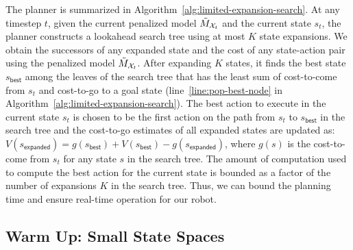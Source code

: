 The planner is summarized in Algorithm~\ref{alg:limited-expansion-search}. At any
timestep $t$, given the
current penalized model $\tilde{M}_{\mathcal{X}_t}$ and the current
state $s_t$, the planner constructs a lookahead
search tree using at most $K$ state expansions. We obtain the successors of any
expanded state and the cost of any state-action pair using the
penalized model $\tilde{M}_{\mathcal{X}_t}$.
After expanding $K$
states, it finds the best state $s_{\mathsf{best}}$ among the leaves of the search tree
that has the least sum of cost-to-come from $s_t$ and
cost-to-go to a goal state (line~\ref{line:pop-best-node} in Algorithm~\ref{alg:limited-expansion-search}). The best action to execute in the current
state $s_t$ is chosen to be the first action on the path from $s_t$ to
$s_{\mathsf{best}}$ in the search tree and the cost-to-go estimates of
all expanded states are updated as: $V(s_{\mathsf{expanded}}) =
g(s_{\mathsf{best}}) + V(s_{\mathsf{best}}) -
g(s_{\mathsf{expanded}})$, where $g(s)$ is the cost-to-come from $s_t$
for any state $s$ in the search tree.
The amount of computation used to compute the best action for the
current state is bounded as a factor of the number of expansions $K$ in the search
tree. Thus, we can bound the planning time and ensure real-time
operation for our robot.



\subsection{Warm Up: Small State Spaces}
\label{sec:small-state-spaces}

